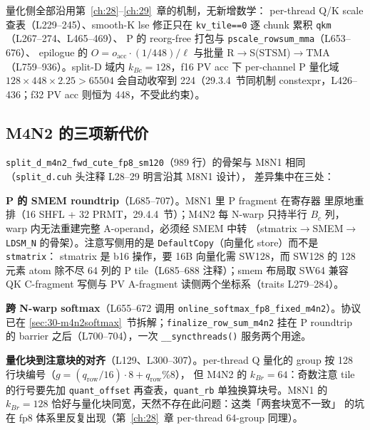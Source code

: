 量化侧全部沿用第~\ref{ch:28}--\ref{ch:29}~章的机制，无新增数学：
per-thread Q/K scale 查表（L229--245）、smooth-K lse 修正只在
\texttt{kv\_tile==0} 逐 chunk 累积 \texttt{qkm}（L267--274、L465--469）、
P 的 reorg-free 打包与 \texttt{pscale\_rowsum\_mma}（L653--676）、
epilogue 的 $O=o_{\text{acc}}\cdot(1/448)/\ell$ 与批量
R$\to$S(STSM)$\to$TMA（L759--936）。split-D 域内
$k_{Bc}=128$，f16 PV acc 下 per-channel P 量化域
$128\times448\times2.25>65504$
会自动收窄到 224（29.3.4~节同机制 constexpr，L426--436；f32 PV acc
则恒为 448，不受此约束）。

\subsection{M4N2 的三项新代价}

\texttt{split\_d\_m4n2\_fwd\_cute\_fp8\_sm120}（989 行）的骨架与
M8N1 相同（\texttt{split\_d.cuh} 头注释 L28--29 明言沿其 M8N1 设计），
差异集中在三处：

\textbf{P 的 SMEM roundtrip}（L685--707）。M8N1 里 P fragment 在寄存器
里原地重排（16 SHFL + 32 PRMT，29.4.4~节）；M4N2 每 N-warp 只持半行
$B_c$ 列，warp 内无法重建完整 A-operand，必须经 SMEM 中转
（stmatrix$\to$SMEM$\to$\texttt{LDSM\_N} 的骨架）。注意写侧用的是
\texttt{DefaultCopy}（向量化 store）而不是 \texttt{stmatrix}：
stmatrix 是 b16 操作，要 16B 向量化需 SW128，而 SW128 的 128 元素
atom 除不尽 64 列的 P tile（L685--688 注释）；smem 布局取 SW64 兼容
QK C-fragment 写侧与 PV A-fragment 读侧两个坐标系（traits L279--284）。

\textbf{跨 N-warp softmax}（L655--672 调用
\texttt{online\_softmax\allowbreak{}\_fp8\allowbreak{}\_fixed\allowbreak{}\_m4n2}）。协议已在
\ref{sec:30-m4n2softmax}~节拆解；\texttt{finalize\_row\_sum\allowbreak{}\_m4n2}
挂在 P roundtrip 的 barrier 之后（L700--704），一次
\texttt{\_\_syncthreads()} 服务两个用途。

\textbf{量化块到注意块的对齐}（L129、L300--307）。per-thread Q 量化的
group 按 128 行块编号（$g=(q_{\text{row}}/16)\cdot8+q_{\text{row}}\%8$），
但 M4N2 的 $k_{Br}=64$：奇数注意 tile 的行号要先加
\texttt{quant\_offset} 再查表，\texttt{quant\_rb} 单独换算块号。M8N1
的 $k_{Br}=128$ 恰好与量化块同宽，天然不存在此问题：这类「两套块宽不一致」
的坑在 fp8 体系里反复出现（第~\ref{ch:28}~章 per-thread 64-group 同理）。

